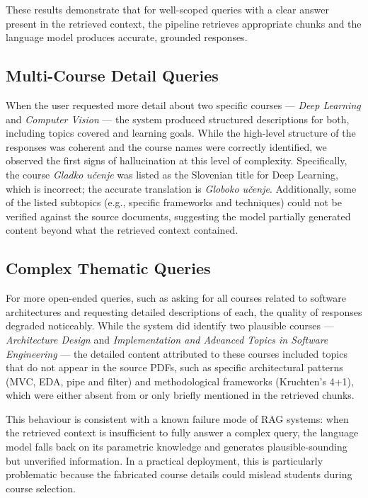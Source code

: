 \documentclass[fleqn,moreauthors,10pt]{ds_report}
\begin{document}
These results demonstrate that for well-scoped queries with a clear answer present in the retrieved context, the pipeline retrieves appropriate chunks and the language model produces accurate, grounded responses.

\subsection*{Multi-Course Detail Queries}

When the user requested more detail about two specific courses --- \textit{Deep Learning} and \textit{Computer Vision} --- the system produced structured descriptions for both, including topics covered and learning goals. While the high-level structure of the responses was coherent and the course names were correctly identified, we observed the first signs of hallucination at this level of complexity. Specifically, the course \textit{Gladko učenje} was listed as the Slovenian title for Deep Learning, which is incorrect; the accurate translation is \textit{Globoko učenje}. Additionally, some of the listed subtopics (e.g., specific frameworks and techniques) could not be verified against the source documents, suggesting the model partially generated content beyond what the retrieved context contained.

\subsection*{Complex Thematic Queries}

For more open-ended queries, such as asking for all courses related to software architectures and requesting detailed descriptions of each, the quality of responses degraded noticeably. While the system did identify two plausible courses --- \textit{Architecture Design} and \textit{Implementation and Advanced Topics in Software Engineering} --- the detailed content attributed to these courses included topics that do not appear in the source PDFs, such as specific architectural patterns (MVC, EDA, pipe and filter) and methodological frameworks (Kruchten's 4+1), which were either absent from or only briefly mentioned in the retrieved chunks.

This behaviour is consistent with a known failure mode of RAG systems: when the retrieved context is insufficient to fully answer a complex query, the language model falls back on its parametric knowledge and generates plausible-sounding but unverified information. In a practical deployment, this is particularly problematic because the fabricated course details could mislead students during course selection.
\end{document}
